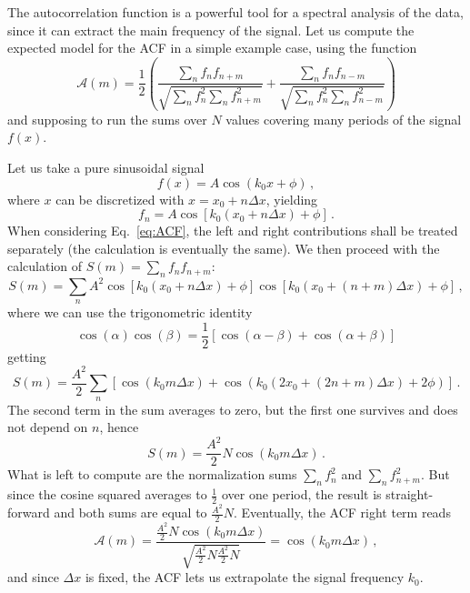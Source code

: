 \label{chap:app_ACF}
The autocorrelation function is a powerful tool for a spectral analysis of the data, since it can extract the main frequency of the signal. Let us compute the expected model for the ACF in a simple example case, using the function
\begin{equation}
    \mathcal{A}(m) = \frac{1}{2} \left( \frac{\sum_{n} f_n f_{n+m}}{\sqrt{\sum_{n} f_n^2 \sum_{n} f_{n+m}^2}} + \frac{\sum_{n} f_n f_{n-m}}{\sqrt{\sum_{n} f_n^2 \sum_{n} f_{n-m}^2}} \right)
    \label{eq:ACF}
\end{equation}
and supposing to run the sums over $N$ values covering many periods of the signal $f(x)$.

Let us take a pure sinusoidal signal
\[
    f(x) = A\cos(k_0 x + \phi)\, ,
\]  
where $x$ can be discretized with $x = x_0 + n\Delta x$, yielding
\begin{equation*}
    f_n = A\cos[k_0(x_0 + n\Delta x) + \phi]\, .
\end{equation*}
When considering Eq.\ \eqref{eq:ACF}, the left and right contributions shall be treated separately (the calculation is eventually the same). We then proceed with the calculation of $S(m) = \sum_n f_n f_{n+m}$:
\begin{equation*}
    S(m) = \sum_n A^2 \cos[k_0(x_0 + n\Delta x) + \phi] \cos[k_0(x_0 + (n+m)\Delta x) + \phi]\, ,
\end{equation*}
where we can use the trigonometric identity
\[
    \cos(\alpha)\cos(\beta) = \frac{1}{2}[\cos(\alpha-\beta) + \cos(\alpha+\beta)]
\]
getting
\begin{equation*}
    S(m) = \frac{A^2}{2}\sum_n [\cos(k_0 m \Delta x) + \cos(k_0(2x_0 + (2n + m)\Delta x) + 2\phi)]\, .
\end{equation*}
The second term in the sum averages to zero, but the first one survives and does not depend on $n$, hence
\[
    S(m) = \frac{A^2}{2}N\cos(k_0 m \Delta x)\, .
\]
What is left to compute are the normalization sums $\sum_n f_n^2$ and $\sum_n f_{n+m}^2$. But since the cosine squared averages to $\frac{1}{2}$ over one period, the result is straight-forward and both sums are equal to $\frac{A^2}{2}N$. Eventually, the ACF right term reads
\begin{equation*}
    \mathcal{A}(m) = \frac{\frac{A^2}{2}N\cos(k_0 m \Delta x)}{\sqrt{\frac{A^2}{2}N \frac{A^2}{2}N}} = \cos(k_0 m \Delta x)\, ,
\end{equation*}
and since $\Delta x$ is fixed, the ACF lets us extrapolate the signal frequency $k_0$.

